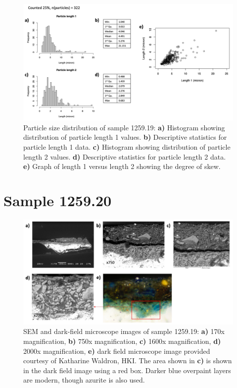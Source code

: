 \begin{figure}[H]
\centering
  \includegraphics[width=0.8\linewidth]{1259.19_partsize}
\caption[Particle size distribution, sample 1259.19.]{Particle size distribution of sample 1259.19: \textbf{a)} Histogram showing distribution of particle length 1 values. \textbf{b)} Descriptive statistics for particle length 1 data. \textbf{c)} Histogram showing distribution of particle length 2 values. \textbf{d)} Descriptive statistics for particle length 2 data. \textbf{e)} Graph of length 1 versus length 2 showing the degree of skew.}
\label{fig:1259.19_partsize}
\end{figure}



\section{Sample 1259.20}

\begin{figure}[H]
  \centering
  \includegraphics[width=0.8\linewidth]{1259.20_imgs}
\caption[SEM and dark-field microscope images of sample 1259.19.]{SEM and dark-field microscope images of sample 1259.19: \textbf{a)} 170x magnification, \textbf{b)} 750x magnification, \textbf{c)} 1600x magnification, \textbf{d)} 2000x magnification, \textbf{e)} dark field microscope image provided courtesy of Katharine Waldron, HKI. The area shown in \textbf{c)} is shown in the dark field image using a red box. Darker blue overpaint layers are modern, though azurite is also used.}
\label{fig:1259.20_imgs}
\end{figure}

